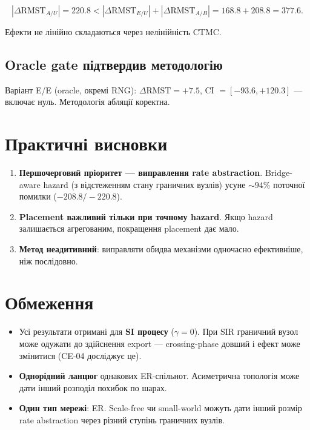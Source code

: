 \documentclass[11pt,a4paper]{article}
\begin{document}
\[
  |\Delta\mathrm{RMST}_{A/U}| = 220.8 < |\Delta\mathrm{RMST}_{E/U}| + |\Delta\mathrm{RMST}_{A/B}|
  = 168.8 + 208.8 = 377.6.
\]

Ефекти не лінійно складаються через нелінійність CTMC.

\subsection{Oracle gate підтвердив методологію}

Варіант E/E (oracle, окремі RNG): $\Delta\mathrm{RMST} = +7.5$,
CI $= [-93.6, +120.3]$ --- включає нуль. Методологія абляції коректна.

\section{Практичні висновки}

\begin{enumerate}
  \item \textbf{Першочерговий пріоритет --- виправлення rate abstraction}.
        Bridge-aware hazard (з відстеженням стану граничних вузлів) усуне $\sim 94\%$
        поточної помилки ($-208.8 / -220.8$).
  \item \textbf{Placement важливий тільки при точному hazard}.
        Якщо hazard залишається агрегованим, покращення placement дає мало.
  \item \textbf{Метод неадитивний}: виправляти обидва механізми одночасно
        ефективніше, ніж послідовно.
\end{enumerate}

\section{Обмеження}

\begin{itemize}
  \item Усі результати отримані для \textbf{SI процесу} ($\gamma = 0$).
        При SIR граничний вузол може одужати до здійснення export ---
        crossing-phase довший і ефект може змінитися (CE-04 досліджує це).
  \item \textbf{Однорідний ланцюг} однакових ER-спільнот.
        Асиметрична топологія може дати інший розподіл похибок по шарах.
  \item \textbf{Один тип мережі}: ER. Scale-free чи small-world можуть
        дати інший розмір rate abstraction через різний ступінь граничних вузлів.
\end{itemize}
\end{document}
